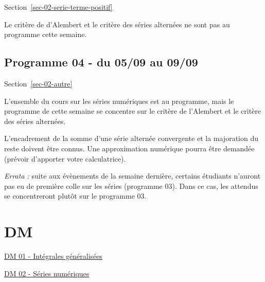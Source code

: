 \documentclass[
  french,
  letterpaper,
  DIV=11,
  numbers=noendperiod]{scrreprt}
\theoremstyle{plain}
\theoremstyle{definition}
\theoremstyle{plain}
\theoremstyle{plain}
\theoremstyle{definition}
\theoremstyle{definition}
\theoremstyle{plain}
\theoremstyle{remark}
\begin{document}
Section~\ref{sec-02-serie-terme-positif}

Le critère de d'Alembert et le critère des séries alternées ne sont pas
au programme cette semaine.

\section*{Programme 04 - du 05/09 au
09/09}\label{programme-04---du-0509-au-0909}


Section~\ref{sec-02-autre}

L'ensemble du cours sur les séries numériques est au programme, mais le
programme de cette semaine se concentre sur le critère de l'Alembert et
le critère des séries alternées.

L'encadrement de la somme d'une série alternée convergente et la
majoration du reste doivent être connus. Une approximation numérique
pourra être demandée (prévoir d'apporter votre calculatrice).

\emph{Errata : } suite aux évènements de la semaine dernière, certains
étudiants n'auront pas eu de première colle sur les séries (programme
03). Dans ce cas, les attendus se concentreront plutôt sur le programme
03.


\chapter*{DM}\label{dm}


\href{./pdf/dm/01.pdf}{DM 01 - Intégrales généralisées}

\href{./pdf/dm/02.pdf}{DM 02 - Séries numériques}
\end{document}
